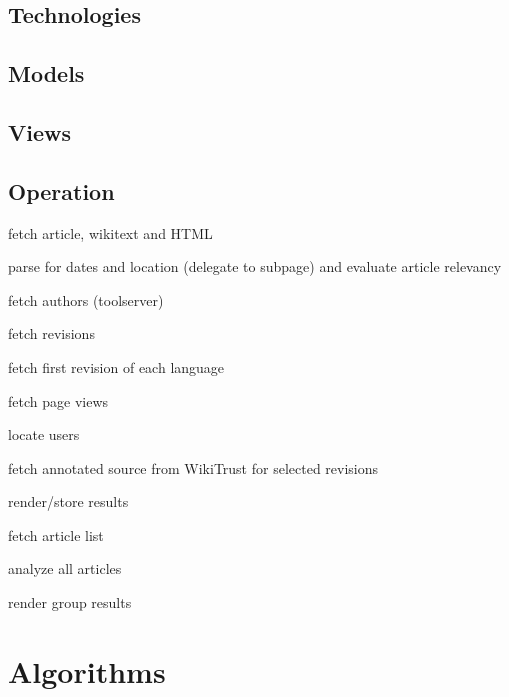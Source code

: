 
\subsection{Technologies}

\subsection{Models}

\subsection{Views}

\subsection{Operation}

\begin{todos}
    \item fetch article, wikitext and HTML
    \item parse for dates and location (delegate to subpage) and evaluate article relevancy
    \item fetch authors (toolserver)
    \item fetch revisions
    \item fetch first revision of each language
    \item fetch page views
    \item locate users
    \item fetch annotated source from WikiTrust for selected revisions 
    \item render/store results
\end{todos}


\begin{todos}
    \item fetch article list
    \item analyze all articles
    \item render group results
\end{todos}


\section{Algorithms}


